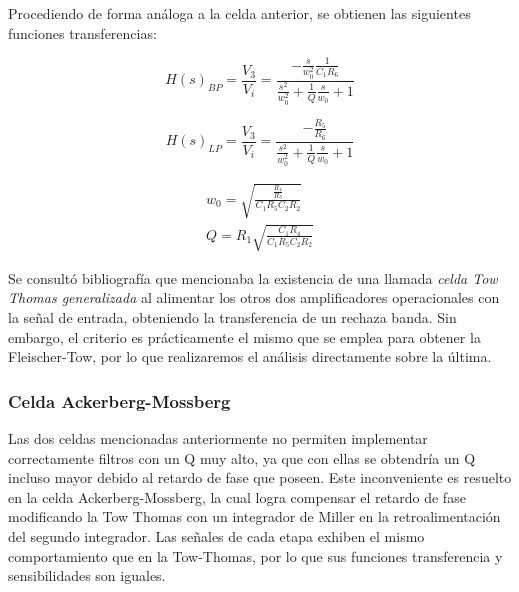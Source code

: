 Procediendo de forma análoga a la celda anterior, se obtienen las siguientes funciones transferencias:

\begin{equation}
        H(s)_{BP} = \frac{V_{3}}{V_{i}} = \frac{-\frac{s}{w_{0}^{2}}\frac{1}{C_{1}R_{6}}}{\frac{s^{2}}{w_{0}^{2}} + \frac{1}{Q} \frac{s}{w_{0}} + 1}
    \label{eq:TowThomas1}
\end{equation}

\begin{equation}
        H(s)_{LP} = \frac{V_{3}}{V_{i}} = \frac{-\frac{R_{5}}{R_{6}}}{\frac{s^{2}}{w_{0}^{2}} + \frac{1}{Q} \frac{s}{w_{0}} + 1}
    \label{eq:TowThomas2}
\end{equation}



\begin{equation}
    \begin{matrix}
        w_{0} = \sqrt{\frac{\frac{R_{4}}{R_{3}}}{C_{1}R_{5}C_{2}R_{2}}}
        \\
        Q = R_{1}\sqrt{\frac{C_{1}R_{4}}{C_{1}R_{5}C_{2}R_{2}}}
    \end{matrix}
    \label{eq:TowThomas1}
\end{equation}

Se consultó bibliografía que mencionaba la existencia de una llamada \emph{celda Tow Thomas generalizada} al alimentar los otros dos amplificadores operacionales con la señal de entrada, obteniendo la transferencia de un rechaza banda. Sin embargo, el criterio es prácticamente el mismo que se emplea para obtener la Fleischer-Tow, por lo que realizaremos el análisis directamente sobre la última. 

\subsubsection{Celda Ackerberg-Mossberg}

Las dos celdas mencionadas anteriormente no permiten implementar correctamente filtros con un Q muy alto, ya que con ellas se obtendría un Q incluso mayor debido al retardo de fase que poseen. Este inconveniente es resuelto en la celda Ackerberg-Mossberg, la cual logra compensar el retardo de fase modificando la Tow Thomas con un integrador de Miller en la retroalimentación del segundo integrador. Las señales de cada etapa exhiben el mismo comportamiento que en la Tow-Thomas, por lo que sus funciones transferencia y sensibilidades son iguales. 

